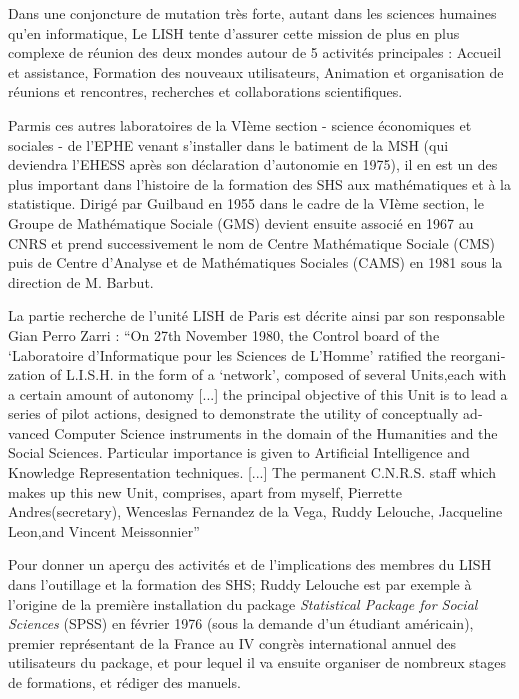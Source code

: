 Dans une conjoncture de mutation très forte, autant dans les sciences humaines qu'en informatique, Le LISH tente d'assurer cette mission de plus en plus complexe de réunion des deux mondes autour de 5 activités principales : Accueil et assistance, Formation des nouveaux utilisateurs, Animation et organisation de réunions et rencontres, recherches et collaborations scientifiques. \autocite{LISH1980}


Parmis ces autres laboratoires de la VIème section - science économiques et sociales - de l'EPHE venant s'installer dans le batiment de la MSH (qui deviendra l'EHESS après son déclaration d'autonomie en 1975), il en est un des plus important dans l'histoire de la formation des SHS aux mathématiques et à la statistique. Dirigé par Guilbaud en 1955 dans le cadre de la VIème section, le Groupe de Mathématique Sociale (GMS) devient ensuite associé en 1967 au CNRS et prend successivement le nom de Centre Mathématique Sociale (CMS) puis de Centre d’Analyse et de Mathématiques Sociales (CAMS) en 1981 sous la direction de M. Barbut. 

La partie recherche de l'unité LISH de Paris est décrite ainsi par son responsable Gian Perro Zarri : \foreignquote{english}{On 27th November 1980, the Control board of the \enquote{Laboratoire d'Informatique pour les Sciences de L'Homme} ratified the reorganization of L.I.S.H. in the form of a \enquote{network}, composed of several Units,each with a certain amount of autonomy [...] the principal objective of this Unit is to lead a series of pilot actions, designed to demonstrate the utility of conceptually advanced Computer Science instruments in the domain of the Humanities and the Social Sciences. Particular importance is given to Artificial Intelligence and Knowledge Representation techniques. [...]  The permanent C.N.R.S. staff which makes up this new Unit, comprises, apart from myself, Pierrette Andres(secretary), Wenceslas Fernandez de la Vega, Ruddy Lelouche, Jacqueline Leon,and Vincent Meissonnier} \autocite{Zarri1981}

Pour donner un aperçu des activités et de l'implications des membres du LISH dans l'outillage et la formation des SHS; Ruddy Lelouche est par exemple à l'origine de la première installation du package \textit{Statistical Package for Social Sciences} (SPSS) en février 1976 (sous la demande d'un étudiant américain), premier représentant de la France au IV congrès international annuel des utilisateurs du package, et pour lequel il va ensuite organiser de nombreux stages de formations, et rédiger des manuels.

